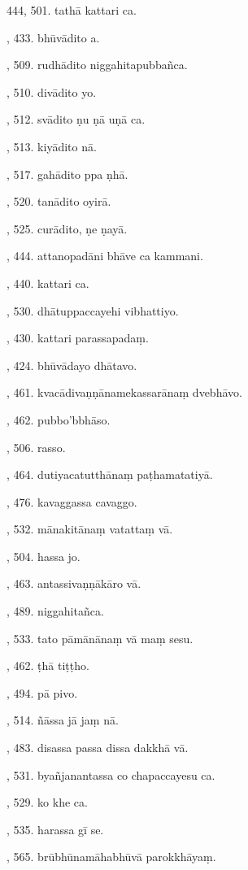 444, 501. tathā kattari ca.\par {}, 433. bhūvādito a.\par {}, 509. rudhādito niggahitapubbañca.\par {}, 510. divādito yo.\par {}, 512. svādito ṇu ṇā uṇā ca.\par {}, 513. kiyādito nā.\par {}, 517. gahādito ppa ṇhā.\par {}, 520. tanādito oyirā.\par {}, 525. curādito, ṇe ṇayā.\par {}, 444. attanopadāni bhāve ca kammani.\par {}, 440. kattari ca.\par {}, 530. dhātuppaccayehi vibhattiyo.\par {}, 430. kattari parassapadaṃ.\par {}, 424. bhūvādayo dhātavo.\par {}, 461. kvacādivaṇṇānamekassarānaṃ dvebhāvo.\par {}, 462. pubbo’bbhāso.\par {}, 506. rasso.\par {}, 464. dutiyacatutthānaṃ paṭhamatatiyā.\par {}, 476. kavaggassa cavaggo.\par {}, 532. mānakitānaṃ vatattaṃ vā.\par {}, 504. hassa jo.\par {}, 463. antassivaṇṇākāro vā.\par {}, 489. niggahitañca.\par {}, 533. tato pāmānānaṃ vā maṃ sesu.\par {}, 462. ṭhā tiṭṭho.\par {}, 494. pā pivo.\par {}, 514. ñāssa jā jaṃ nā.\par {}, 483. disassa passa dissa dakkhā vā.\par {}, 531. byañjanantassa co chapaccayesu ca.\par {}, 529. ko khe ca.\par {}, 535. harassa gī se.\par {}, 565. brūbhūnamāhabhūvā parokkhāyaṃ.\par \noindent
